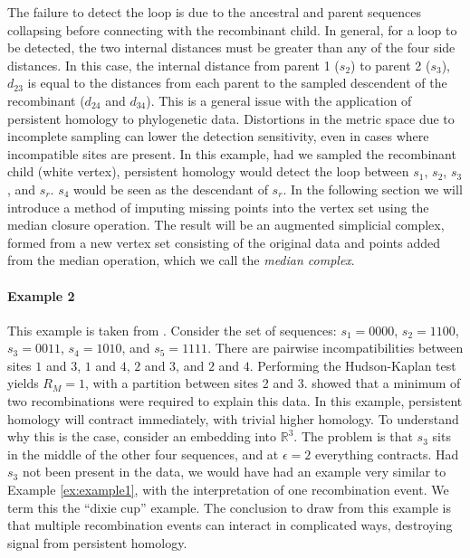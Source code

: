 The failure to detect the loop is due to the ancestral and parent sequences collapsing before connecting with the recombinant child.
In general, for a loop to be detected, the two internal distances must be greater than any of the four side distances.
In this case, the internal distance from parent 1 ($s_2$) to parent 2 ($s_3$), $d_{23}$ is equal to the distances from each parent to the sampled descendent of the recombinant ($d_{24}$ and $d_{34}$).
This is a general issue with the application of persistent homology to phylogenetic data.
Distortions in the metric space due to incomplete sampling can lower the detection sensitivity, even in cases where incompatible sites are present.
In this example, had we sampled the recombinant child (white vertex), persistent homology would detect the loop between $s_1$, $s_2$, $s_3$, and $s_r$.
$s_4$ would be seen as the descendant of $s_r$.
In the following section we will introduce a method of imputing missing points into the vertex set using the median closure operation.
The result will be an augmented simplicial complex, formed from a new vertex set consisting of the original data and points added from the median operation, which we call the \emph{median complex}.

\paragraph{Example 2}
\label{ex:example2}
%
This example is taken from \citet{Song:2005}.
Consider the set of sequences: $s_{1}=0000$, $s_{2}=1100$, $s_{3}=0011$, $s_{4}=1010$, and $s_{5}=1111$.
There are pairwise incompatibilities between sites $1$ and $3$, $1$ and $4$, $2$ and $3$, and $2$ and $4$.
Performing the Hudson-Kaplan test yields $R_M=1$, with a partition between sites 2 and 3.
\citet{Song:2005} showed that a minimum of two recombinations were required to explain this data.
In this example, persistent homology will contract immediately, with trivial higher homology.
To understand why this is the case, consider an embedding into $\mathbb{R}^3$.
The problem is that $s_{3}$ sits in the middle of the other four sequences, and at $\epsilon=2$ everything contracts.
Had $s_{3}$ not been present in the data, we would have had an example very similar to Example \ref{ex:example1}, with the interpretation of one recombination event.
We term this the ``dixie cup'' example.
The conclusion to draw from this example is that multiple recombination events can interact in complicated ways, destroying signal from persistent homology.

